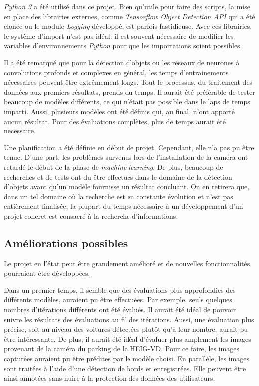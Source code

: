 \textit{Python 3} a été utilisé dans ce projet. Bien qu'utile pour faire des scripts, la mise en place des librairies externes, comme \textit{Tensorflow Object Detection API} qui a été clonée ou le module \textit{Logging} développé, est parfois fastidieuse. Avec ces librairies, le système d'import n'est pas idéal: il est souvent nécessaire de modifier les variables d'environnements \textit{Python} pour que les importations soient possibles.

Il a été remarqué que pour la détection d'objets ou les réseaux de neurones à convolutions profonds et complexes en général, les temps d'entrainements nécessaires peuvent être extrêmement longs. Tout le processus, du traitement des données aux premiers résultats, prends du temps. Il aurait été préférable de tester beaucoup de modèles différents, ce qui n'était pas possible dans le laps de temps imparti. Aussi, plusieurs modèles ont été définis qui, au final, n'ont apporté aucun résultat. Pour des évaluations complètes, plus de temps aurait été nécessaire.

Une planification a été définie en début de projet. Cependant, elle n'a pas pu être tenue. D'une part, les problèmes survenus lors de l'installation de la caméra ont retardé le début de la phase de \textit{machine learning}. De plus, beaucoup de recherches et de tests ont du être effectués dans le domaine de la détection d'objets avant qu'un modèle fournisse un résultat concluant. On en retirera que, dans un tel domaine où la recherche est en constante évolution et n'est pas entièrement finalisée, la plupart du temps nécessaire à un développement d'un projet concret est consacré à la recherche d'informations.

\subsection{Améliorations possibles}
Le projet en l'état peut être grandement amélioré et de nouvelles fonctionnalités pourraient être développées.

Dans un premier temps, il semble que des évaluations plus approfondies des différents modèles, auraient pu être effectuées. Par exemple, seuls quelques nombres d'itérations différents ont été évalués. Il aurait été idéal de pouvoir suivre les résultats des évaluations au fil des itérations. Aussi, une évaluation plus précise, soit au niveau des voitures détectées plutôt qu'à leur nombre, aurait pu être intéressante. De plus, il aurait été idéal d'évaluer plus amplement les images provenant de la caméra du parking de la HEIG-VD. Pour ce faire, les images capturées auraient pu être prédites par le modèle choisi. En parallèle, les images sont traitées à l'aide d'une détection de bords et enregistrées. Elle peuvent être ainsi annotées sans nuire à la protection des données des utilisateurs. 

